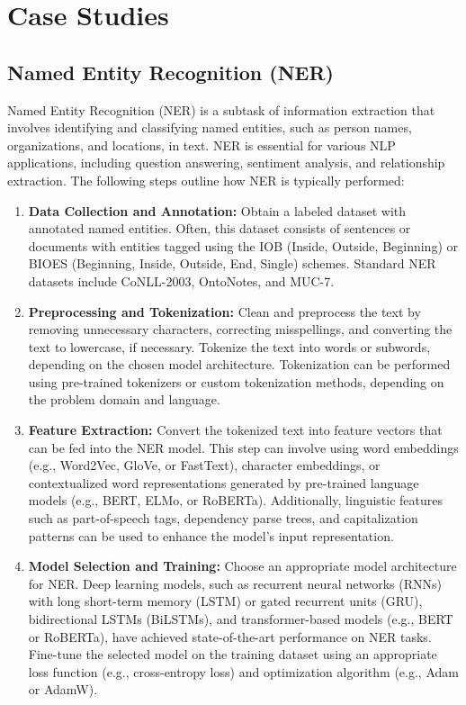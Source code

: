 \documentclass[12pt]{article}
\begin{document}
\section{Case Studies}
\subsection{Named Entity Recognition (NER)}

Named Entity Recognition (NER) is a subtask of information extraction that involves identifying and classifying named entities, such as person names, organizations, and locations, in text. NER is essential for various NLP applications, including question answering, sentiment analysis, and relationship extraction. The following steps outline how NER is typically performed:

\begin{enumerate}
\item \textbf{Data Collection and Annotation:} Obtain a labeled dataset with annotated named entities. Often, this dataset consists of sentences or documents with entities tagged using the IOB (Inside, Outside, Beginning) or BIOES (Beginning, Inside, Outside, End, Single) schemes. Standard NER datasets include CoNLL-2003, OntoNotes, and MUC-7.

\item \textbf{Preprocessing and Tokenization:} Clean and preprocess the text by removing unnecessary characters, correcting misspellings, and converting the text to lowercase, if necessary. Tokenize the text into words or subwords, depending on the chosen model architecture. Tokenization can be performed using pre-trained tokenizers or custom tokenization methods, depending on the problem domain and language.

\item \textbf{Feature Extraction:} Convert the tokenized text into feature vectors that can be fed into the NER model. This step can involve using word embeddings (e.g., Word2Vec, GloVe, or FastText), character embeddings, or contextualized word representations generated by pre-trained language models (e.g., BERT, ELMo, or RoBERTa). Additionally, linguistic features such as part-of-speech tags, dependency parse trees, and capitalization patterns can be used to enhance the model's input representation.

\item \textbf{Model Selection and Training:} Choose an appropriate model architecture for NER. Deep learning models, such as recurrent neural networks (RNNs) with long short-term memory (LSTM) or gated recurrent units (GRU), bidirectional LSTMs (BiLSTMs), and transformer-based models (e.g., BERT or RoBERTa), have achieved state-of-the-art performance on NER tasks. Fine-tune the selected model on the training dataset using an appropriate loss function (e.g., cross-entropy loss) and optimization algorithm (e.g., Adam or AdamW).


\end{enumerate}
\end{document}
